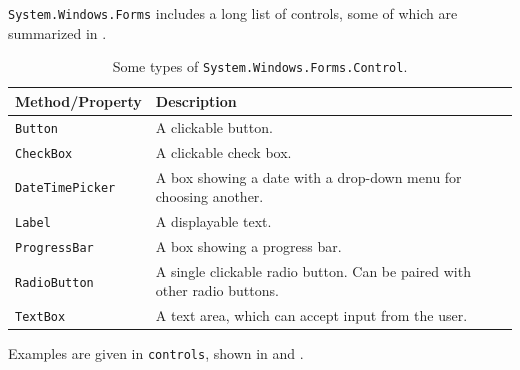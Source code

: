 \documentclass[fsharpNotes.tex]{subfiles}
\begin{document}
\lstinline{System.Windows.Forms} includes a long list of controls, some of which are summarized in .
\begin{table}
  \begin{center}
    \begin{tabularx}{\linewidth}{|l|X|}
      \hline
      \rowcolor{headerRowColor}  Method/Property & Description\\
      \hline
      \lstinline{Button}
      &A clickable button.\\
      \hline
      \lstinline{CheckBox}
      &A clickable check box.\\
      \hline
      \lstinline{DateTimePicker}
      &A box showing a date with a drop-down menu for choosing another.\\
      \hline
      \lstinline{Label}
      &A displayable text.\\
      \hline
      \lstinline{ProgressBar}
      &A box showing a progress bar.\\
      \hline
      \lstinline{RadioButton}
      &A single clickable radio button. Can be paired with other radio buttons.\\
      \hline
      \lstinline{TextBox}
      &A text area, which can accept input from the user.\\
      \hline
    \end{tabularx}
  \end{center}
  \caption{Some types of \lstinline{System.Windows.Forms.Control}.}
  \label{tab:controls}
\end{table}
Examples are given in \lstinline{controls}, shown in  and .
%
%
\end{document}

